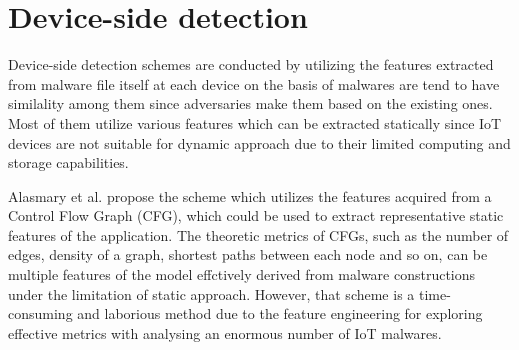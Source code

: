 \section{Device-side detection} 
Device-side detection schemes are conducted by utilizing the features extracted from malware file itself at each device on the basis of malwares are tend to have similality among them since adversaries make them based on the existing ones.
Most of them utilize various features which can be extracted statically since IoT devices are not suitable for dynamic approach due to their limited computing and storage capabilities.

Alasmary et al. \cite{cfg} propose the scheme which utilizes the features acquired from a Control Flow Graph (CFG), which could be used to extract representative static features of the application.
The theoretic metrics of CFGs, such as the number of edges, density of a graph, shortest paths between each node and so on, can be multiple features of the model effctively derived from malware constructions under the limitation of static approach.
However, that scheme is a time-consuming and laborious method due to the feature engineering for exploring effective metrics with analysing an enormous number of IoT malwares.

\newpage

